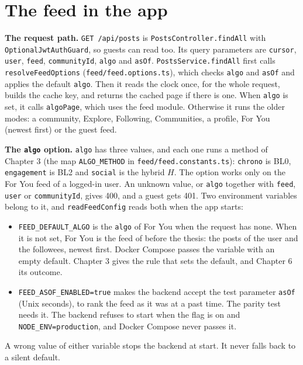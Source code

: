 \section{The feed in the app}
\label{sec:impl-feed}

\textbf{The request path.} \texttt{GET /api/posts} is \texttt{PostsController.findAll} with \texttt{OptionalJwtAuthGuard}, so guests can read too. Its query parameters are \texttt{cursor}, \texttt{user}, \texttt{feed}, \texttt{communityId}, \texttt{algo} and \texttt{asOf}. \texttt{PostsService.findAll} first calls \texttt{resolveFeedOptions} (\texttt{feed/feed.options.ts}), which checks \texttt{algo} and \texttt{asOf} and applies the default \texttt{algo}. Then it reads the clock once, for the whole request, builds the cache key, and returns the cached page if there is one. When \texttt{algo} is set, it calls \texttt{algoPage}, which uses the feed module. Otherwise it runs the older modes: a community, Explore, Following, Communities, a profile, For You (newest first) or the guest feed.

\textbf{The \texttt{algo} option.} \texttt{algo} has three values, and each one runs a method of Chapter 3 (the map \texttt{ALGO\_METHOD} in \texttt{feed/feed.constants.ts}): \texttt{chrono} is BL0, \texttt{engagement} is BL2 and \texttt{social} is the hybrid $H$. The option works only on the For You feed of a logged-in user. An unknown value, or \texttt{algo} together with \texttt{feed}, \texttt{user} or \texttt{communityId}, gives 400, and a guest gets 401. Two environment variables belong to it, and \texttt{readFeedConfig} reads both when the app starts:
\begin{itemize}
  \item \texttt{FEED\_DEFAULT\_ALGO} is the \texttt{algo} of For You when the request has none. When it is not set, For You is the feed of before the thesis: the posts of the user and the followees, newest first. Docker Compose passes the variable with an empty default. Chapter 3 gives the rule that sets the default, and Chapter 6 its outcome.
  \item \texttt{FEED\_ASOF\_ENABLED=true} makes the backend accept the test parameter \texttt{asOf} (Unix seconds), to rank the feed as it was at a past time. The parity test needs it. The backend refuses to start when the flag is on and \texttt{NODE\_ENV=production}, and Docker Compose never passes it.
\end{itemize}
A wrong value of either variable stops the backend at start. It never falls back to a silent default.

